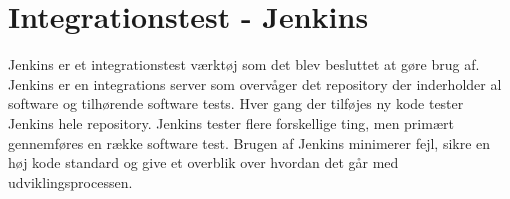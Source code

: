 \newpage

\section{Integrationstest - Jenkins}
Jenkins er et integrationstest værktøj som det blev besluttet at gøre brug af. Jenkins er en integrations server som overvåger det repository der inderholder al software og tilhørende software tests. Hver gang der tilføjes ny kode tester Jenkins hele repository. Jenkins tester flere forskellige ting, men primært gennemføres en række software test. Brugen af Jenkins minimerer fejl, sikre en høj kode standard og give et overblik over hvordan det går med udviklingsprocessen.  